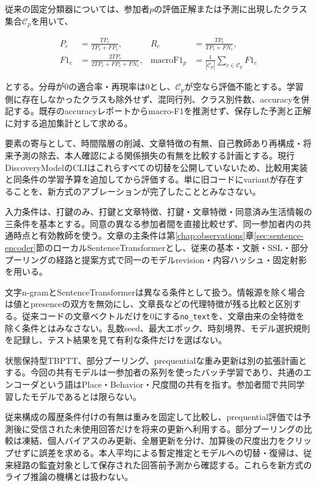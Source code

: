 従来の固定分類器については、参加者\(p\)の評価正解または予測に出現したクラス集合\(\mathcal C_p\)を用いて、

\[
\begin{aligned}
P_c &= \frac{TP_c}{TP_c+FP_c}, &
R_c &= \frac{TP_c}{TP_c+FN_c}, \\
F1_c &= \frac{2TP_c}{2TP_c+FP_c+FN_c}, &
\operatorname{macroF1}_p &= \frac1{|\mathcal C_p|}\sum_{c\in\mathcal C_p}F1_c
\end{aligned}
\]

とする。分母が0の適合率・再現率は0とし、\(\mathcal C_p\)が空なら評価不能とする。学習側に存在しなかったクラスも除外せず、混同行列、クラス別件数、accuracyを併記する。既存のaccuracyレポートからmacro-F1を推測せず、保存した予測と正解に対する追加集計として求める。

要素の寄与として、時間階層の削減、文章特徴の有無、自己教師あり再構成・将来予測の除去、本人確認による関係損失の有無を比較する計画とする。現行DiscoveryModelのCLIはこれらすべての切替を公開していないため、比較用実装と同条件の学習予算を追加してから評価する。単に旧コードにvariantが存在することを、新方式のアブレーションが完了したこととみなさない。

入力条件は、打鍵のみ、打鍵と文章特徴、打鍵・文章特徴・同意済み生活情報の三条件を基本とする。同意の異なる参加者間を直接比較せず、同一参加者内の共通時点と有効教師を使う。文章の主条件は第\ref{chap:observations}章\ref{sec:sentence-encoder}節のローカルSentenceTransformerとし、従来の基本・文脈・SSL・部分プーリングの経路と提案方式で同一のモデルrevision・内容ハッシュ・固定射影を用いる。

文字n-gramとSentenceTransformerは異なる条件として扱う。情報源を除く場合は値とpresenceの双方を無効にし、文章長などの代理特徴が残る比較と区別する。従来コードの文章ベクトルだけを0にする\texttt{no\_text}を、文章由来の全特徴を除く条件とはみなさない。乱数seed、最大エポック、時刻境界、モデル選択規則を記録し、テスト結果を見て有利な条件だけを選ばない。

状態保持型TBPTT、部分プーリング、prequentialな重み更新は別の拡張計画とする。今回の共有モデルは一参加者の系列を使ったバッチ学習であり、共通のエンコーダという語はPlace・Behavior・尺度間の共有を指す。参加者間で共同学習したモデルであるとは限らない。

従来構成の履歴条件付けの有無は重みを固定して比較し、prequential評価では予測後に受信された未使用回答だけを将来の更新へ利用する。部分プーリングの比較は凍結、個人バイアスのみ更新、全層更新を分け、加算後の尺度出力をクリップせずに誤差を求める。本人平均による暫定推定とモデルへの切替・復帰は、従来経路の監査対象として保存された回答前予測から確認する。これらを新方式のライブ推論の機構とは扱わない。

